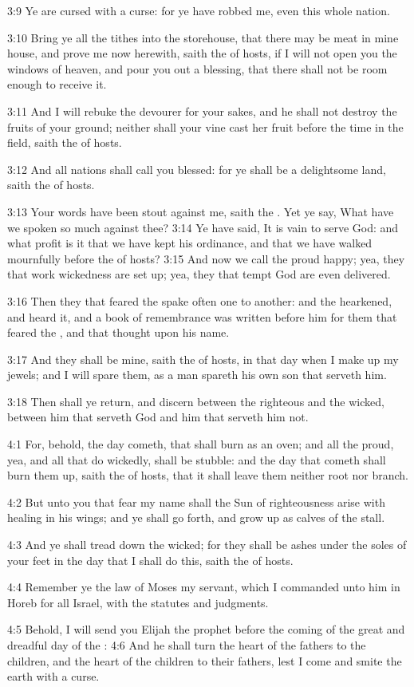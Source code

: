 3:9 Ye are cursed with a curse: for ye have robbed me, even this whole
nation.

3:10 Bring ye all the tithes into the storehouse, that there may be
meat in mine house, and prove me now herewith, saith the \LORD of
hosts, if I will not open you the windows of heaven, and pour you out
a blessing, that there shall not be room enough to receive it.

3:11 And I will rebuke the devourer for your sakes, and he shall not
destroy the fruits of your ground; neither shall your vine cast her
fruit before the time in the field, saith the \LORD of hosts.

3:12 And all nations shall call you blessed: for ye shall be a
delightsome land, saith the \LORD of hosts.

3:13 Your words have been stout against me, saith the \LORD. Yet ye
say, What have we spoken so much against thee?  3:14 Ye have said, It
is vain to serve God: and what profit is it that we have kept his
ordinance, and that we have walked mournfully before the \LORD of
hosts?  3:15 And now we call the proud happy; yea, they that work
wickedness are set up; yea, they that tempt God are even delivered.

3:16 Then they that feared the \LORD spake often one to another: and
the \LORD hearkened, and heard it, and a book of remembrance was
written before him for them that feared the \LORD, and that thought
upon his name.

3:17 And they shall be mine, saith the \LORD of hosts, in that day when
I make up my jewels; and I will spare them, as a man spareth his own
son that serveth him.

3:18 Then shall ye return, and discern between the righteous and the
wicked, between him that serveth God and him that serveth him not.

4:1 For, behold, the day cometh, that shall burn as an oven; and all
the proud, yea, and all that do wickedly, shall be stubble: and the
day that cometh shall burn them up, saith the \LORD of hosts, that it
shall leave them neither root nor branch.

4:2 But unto you that fear my name shall the Sun of righteousness
arise with healing in his wings; and ye shall go forth, and grow up as
calves of the stall.

4:3 And ye shall tread down the wicked; for they shall be ashes under
the soles of your feet in the day that I shall do this, saith the \LORD
of hosts.

4:4 Remember ye the law of Moses my servant, which I commanded unto
him in Horeb for all Israel, with the statutes and judgments.

4:5 Behold, I will send you Elijah the prophet before the coming of
the great and dreadful day of the \LORD: 4:6 And he shall turn the
heart of the fathers to the children, and the heart of the children to
their fathers, lest I come and smite the earth with a curse.

